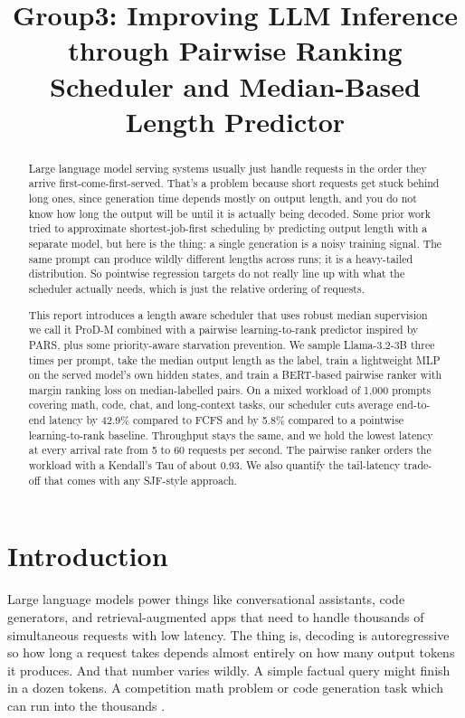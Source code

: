 \documentclass[conference]{IEEEtran}
\begin{document}
\title{ Group3: Improving LLM Inference through Pairwise Ranking Scheduler and Median-Based Length Predictor}

\author{
}

\maketitle

\begin{abstract}
Large language model serving systems usually just handle requests in the order they arrive first-come-first-served. That's a problem because short requests get stuck behind long ones, since generation time depends mostly on output length, and you do not know how long the output will be until it is actually being decoded. Some prior work tried to approximate shortest-job-first scheduling by predicting output length with a separate model, but here is the thing: a single generation is a noisy training signal. The same prompt can produce wildly different lengths across runs; it is a heavy-tailed distribution. So pointwise regression targets do not really line up with what the scheduler actually needs, which is just the relative ordering of requests.

This report introduces a length aware scheduler that uses robust median supervision  we call it ProD-M  combined with a pairwise learning-to-rank predictor inspired by PARS, plus some priority-aware starvation prevention. We sample Llama-3.2-3B three times per prompt, take the median output length as the label, train a lightweight MLP on the served model's own hidden states, and train a BERT-based pairwise ranker with margin ranking loss on median-labelled pairs. On a mixed workload of 1,000 prompts covering math, code, chat, and long-context tasks, our scheduler cuts average end-to-end latency by 42.9\% compared to FCFS and by 5.8\% compared to a pointwise learning-to-rank baseline. Throughput stays the same, and we hold the lowest latency at every arrival rate from 5 to 60 requests per second. The pairwise ranker orders the workload with a Kendall's Tau of about 0.93. We also quantify the tail-latency trade-off that comes with any SJF-style approach.
\end{abstract}

\section{Introduction}
Large language models power things like conversational assistants, code generators, and retrieval-augmented apps that need to handle thousands of simultaneous requests with low latency. The thing is, decoding is autoregressive so how long a request takes depends almost entirely on how many output tokens it produces. And that number varies wildly. A simple factual query might finish in a dozen tokens. A competition math problem or code generation task which can run into the thousands \cite{fu2024efficient,tao2025pars}.
\end{document}
